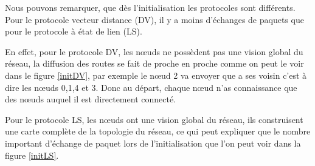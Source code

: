 \documentclass[11pt]{article}
\begin{document}
Nous pouvons remarquer, que dès l’initialisation les protocoles sont différents. Pour le protocole vecteur distance (DV), il y a moins d’échanges de paquets que pour le protocole à état de lien (LS). 

En effet, pour le protocole DV, les nœuds ne possèdent pas une vision global du réseau, la diffusion des routes se fait de proche en proche comme on peut le voir dans le figure \ref{initDV}, par exemple le nœud 2 va envoyer que a ses voisin c'est à dire les nœuds 0,1,4 et 3. Donc au départ, chaque nœud n'as connaissance que des nœuds auquel il est directement connecté. 

Pour le protocole LS, les nœuds ont une vision global du réseau, ils construisent une carte complète de la topologie du réseau, ce qui peut expliquer que le nombre important d'échange de paquet lors de l'initialisation
que l'on peut voir dans la figure \ref{initLS}.
\end{document}
